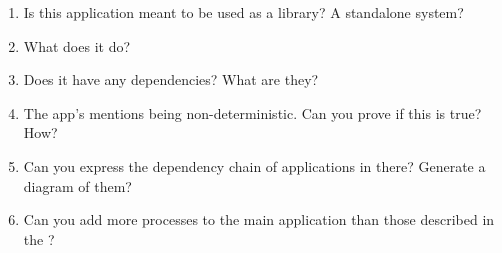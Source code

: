 \begin{enumerate}
	\item Is this application meant to be used as a library? A standalone system?
	\item What does it do?
	\item Does it have any dependencies? What are they?
	\item The app's  mentions being non-deterministic. Can you prove if this is true? How?
	\item Can you express the dependency chain of applications in there? Generate a diagram of them?
	\item Can you add more processes to the main application than those described in the ? 
\end{enumerate}

